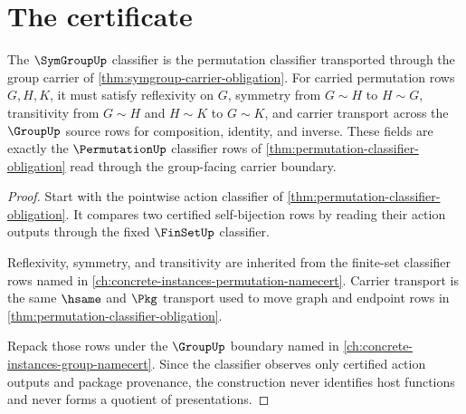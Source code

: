 \section{The certificate}
\label{sec:symgroup-certificate}

\begin{theorem}
\label{thm:symgroup-classifier-obligation}
The $\SymGroupUp$ classifier is the permutation classifier transported through
the group carrier of \autoref{thm:symgroup-carrier-obligation}. For carried
permutation rows $G,H,K$, it must satisfy reflexivity on $G$, symmetry from
$G\sim H$ to $H\sim G$, transitivity from $G\sim H$ and $H\sim K$ to
$G\sim K$, and carrier transport across the $\GroupUp$ source rows for
composition, identity, and inverse. These fields are exactly the
$\PermutationUp$ classifier rows of \autoref{thm:permutation-classifier-obligation}
read through the group-facing carrier boundary.
\end{theorem}
\begin{proof}
Start with the pointwise action classifier of
\autoref{thm:permutation-classifier-obligation}. It compares two certified
self-bijection rows by reading their action outputs through the fixed
$\FinSetUp$ classifier.

Reflexivity, symmetry, and transitivity are inherited from the finite-set
classifier rows named in \autoref{ch:concrete-instances-permutation-namecert}.
Carrier transport is the same $\hsame$ and $\Pkg$ transport used to move graph
and endpoint rows in \autoref{thm:permutation-classifier-obligation}.

Repack those rows under the $\GroupUp$ boundary named in
\autoref{ch:concrete-instances-group-namecert}. Since the classifier observes
only certified action outputs and package provenance, the construction never
identifies host functions and never forms a quotient of presentations.
\end{proof}

